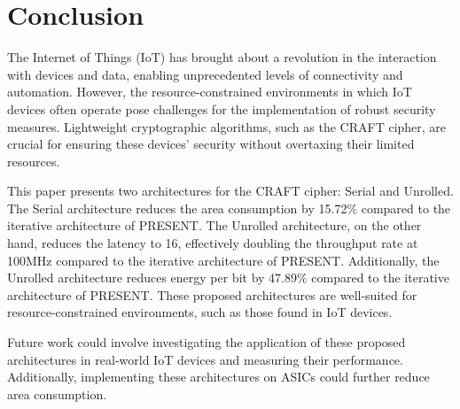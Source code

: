 \documentclass[final,5p,times,twocolumn]{elsarticle}
\begin{document}
\section{Conclusion}\label{sec6}

The Internet of Things (IoT) has brought about a revolution in the interaction with devices and data, enabling unprecedented levels of connectivity and automation. However, the resource-constrained environments in which IoT devices often operate pose challenges for the implementation of robust security measures. Lightweight cryptographic algorithms, such as the CRAFT cipher, are crucial for ensuring these devices' security without overtaxing their limited resources.

This paper presents two architectures for the CRAFT cipher: Serial and Unrolled. The Serial architecture reduces the area consumption by 15.72\% compared to the iterative architecture of PRESENT. The Unrolled architecture, on the other hand, reduces the latency to 16, effectively doubling the throughput rate at 100MHz compared to the iterative architecture of PRESENT. Additionally, the Unrolled architecture reduces energy per bit by 47.89\% compared to the iterative architecture of PRESENT. These proposed architectures are well-suited for resource-constrained environments, such as those found in IoT devices.

Future work could involve investigating the application of these proposed architectures in real-world IoT devices and measuring their performance. Additionally, implementing these architectures on ASICs could further reduce area consumption.



\end{document}
